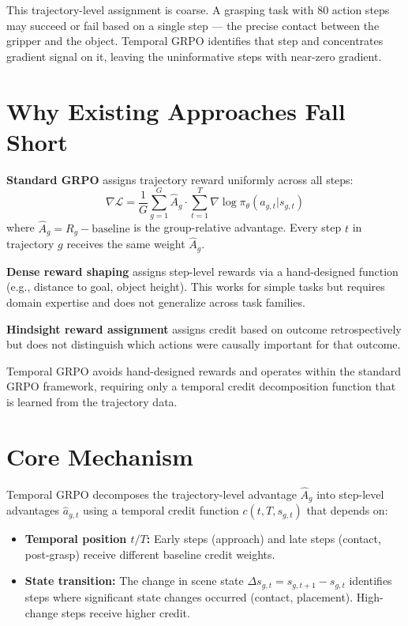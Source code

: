 \documentclass[10pt,twocolumn]{article}
\begin{document}
This trajectory-level assignment is coarse. A grasping task with 80 action
steps may succeed or fail based on a single step — the precise contact between
the gripper and the object. Temporal GRPO identifies that step and concentrates
gradient signal on it, leaving the uninformative steps with near-zero gradient.

\section{Why Existing Approaches Fall Short}

\textbf{Standard GRPO} assigns trajectory reward uniformly across all steps:
\[
  \nabla \mathcal{L} = \frac{1}{G}\sum_{g=1}^G \hat{A}_g \cdot
  \sum_{t=1}^T \nabla \log \pi_\theta(a_{g,t} | s_{g,t})
\]
where $\hat{A}_g = R_g - \text{baseline}$ is the group-relative advantage.
Every step $t$ in trajectory $g$ receives the same weight $\hat{A}_g$.

\textbf{Dense reward shaping} assigns step-level rewards via a hand-designed
function (e.g., distance to goal, object height). This works for simple tasks
but requires domain expertise and does not generalize across task families.

\textbf{Hindsight reward assignment} assigns credit based on outcome
retrospectively but does not distinguish which actions were causally important
for that outcome.

Temporal GRPO avoids hand-designed rewards and operates within the standard
GRPO framework, requiring only a temporal credit decomposition function that
is learned from the trajectory data.

\section{Core Mechanism}

Temporal GRPO decomposes the trajectory-level advantage $\hat{A}_g$ into
step-level advantages $\hat{a}_{g,t}$ using a temporal credit function $c(t, T, s_{g,t})$
that depends on:
\begin{itemize}[itemsep=2pt,parsep=0pt]
  \item \textbf{Temporal position $t/T$:} Early steps (approach) and late
    steps (contact, post-grasp) receive different baseline credit weights.
  \item \textbf{State transition:} The change in scene state $\Delta s_{g,t} = s_{g,t+1} - s_{g,t}$
    identifies steps where significant state changes occurred (contact, placement).
    High-change steps receive higher credit.
\end{itemize}
\end{document}
